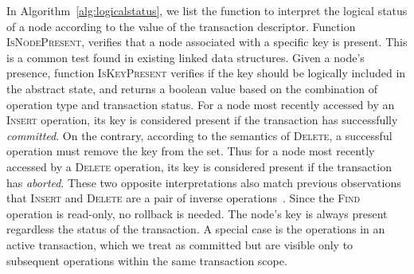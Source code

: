 \documentclass{sig-alternate-05-2015}
\begin{document}
In Algorithm~\ref{alg:logicalstatus}, we list the function to interpret the logical status of a node according to the value of the transaction descriptor.
Function \textsc{IsNodePresent}, verifies that a node associated with a specific key is present.
This is a common test found in existing linked data structures.
Given a node's presence, function \textsc{IsKeyPresent} verifies if the key should be logically included in the abstract state, and returns a boolean value based on the combination of operation type and transaction status.
For a node most recently accessed by an \textsc{Insert} operation, its key is considered present if the transaction has successfully \emph{committed}.
On the contrary, according to the semantics of \textsc{Delete}, a successful operation must remove the key from the set.
Thus for a node most recently accessed by a \textsc{Delete} operation, its key is considered present if the transaction has \emph{aborted}.
These two opposite interpretations also match previous observations that \textsc{Insert} and \textsc{Delete} are a pair of inverse operations~\cite{herlihy2008transactional}.
Since the \textsc{Find} operation is read-only, no rollback is needed.
The node's key is always present regardless the status of the transaction.
A special case is the operations in an active transaction, which we treat as committed but are visible only to subsequent operations within the same transaction scope.
\end{document}

